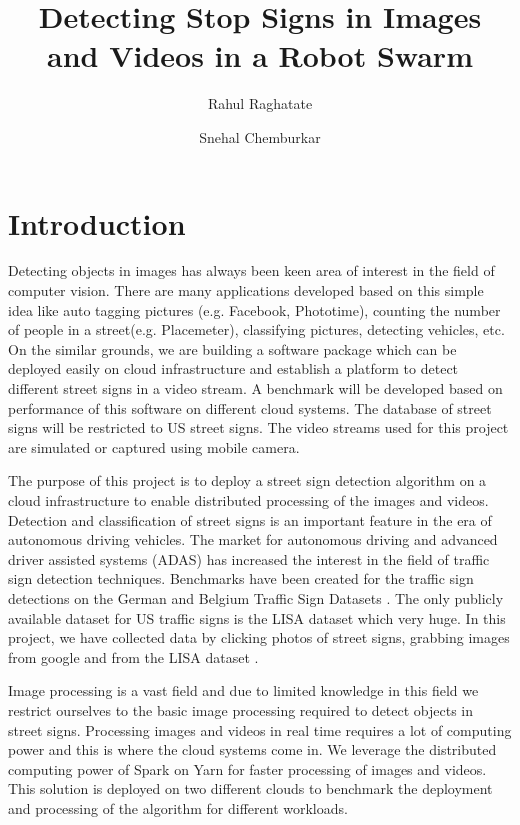 \documentclass[9pt,twocolumn,twoside]{../../styles/osajnl}
\title{Detecting Stop Signs in Images and Videos in a Robot Swarm}
\author[1,*]{Rahul Raghatate}
\author[1]{Snehal Chemburkar}
\affil[1]{School of Informatics and Computing, Bloomington, IN 47408,
  U.S.A.}
\affil[*]{Corresponding authors: rraghata@iu.edu, snehchem@iu.edu}
\begin{document}
\maketitle

\section{Introduction}
Detecting objects in images has always been keen area of interest in
the field of computer vision. There are many applications developed
based on this simple idea like auto tagging pictures (e.g. Facebook,
Phototime), counting the number of people in a
street(e.g. Placemeter), classifying pictures, detecting vehicles,
etc. On the similar grounds, we are building a software package which
can be deployed easily on cloud infrastructure and establish a
platform to detect different street signs in a video stream. A
benchmark will be developed based on performance of this software on
different cloud systems. The database of street signs will be
restricted to US street signs. The video streams used for this project
are simulated or captured using mobile camera.

The purpose of this project is to deploy a street sign detection
algorithm on a cloud infrastructure to enable distributed processing
of the images and videos. Detection and classification of street signs
is an important feature in the era of autonomous driving vehicles. The
market for autonomous driving and advanced driver assisted systems
(ADAS) has increased the interest in the field of traffic sign
detection techniques. Benchmarks have been created for the traffic
sign detections on the German and Belgium Traffic Sign Datasets
\cite{paper-trafficsign}. The only publicly available dataset for US
traffic signs is the LISA dataset \cite{paper-lisadataset} which very
huge. In this project, we have collected data by clicking photos of
street signs, grabbing images from google and from the LISA dataset
\cite{paper-lisadataset}.

Image processing is a vast field and due to limited knowledge in this
field we restrict ourselves to the basic image processing required to
detect objects in street signs. Processing images and videos in real
time requires a lot of computing power and this is where the cloud
systems come in. We leverage the distributed computing power of Spark
on Yarn for faster processing of images and videos. This solution is
deployed on two different clouds to benchmark the deployment and
processing of the algorithm for different workloads.
\end{document}
